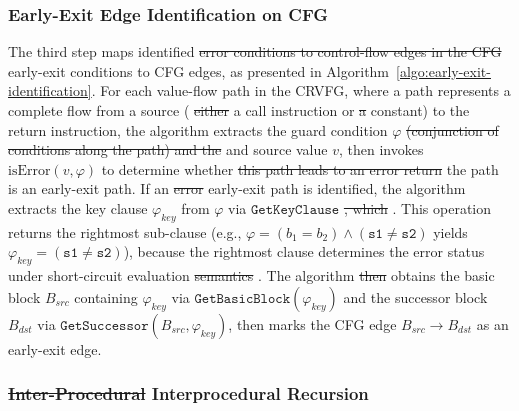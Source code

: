 \documentclass[manuscript,screen,review]{acmart}
\theoremstyle{indenteditalic}
\providecommand{\DIFaddtex}[1]{{\protect\color{blue}#1}} %
\providecommand{\DIFidentity}[1]{#1}
\providecommand{\DIFdeltex}[1]{{%
  \protect\color{red}%
  \normalfont\normalsize
  \let\textbf\DIFidentity
  \let\textit\DIFidentity
  \let\texttt\DIFidentity
  \let\textsc\DIFidentity
  \let\textsf\DIFidentity
  \let\emph\DIFidentity
  \let\uline\DIFidentity
  \sout{#1}%
}} %
\providecommand{\DIFaddbegin}{} %
\providecommand{\DIFaddend}{} %
\providecommand{\DIFdelbegin}{} %
\providecommand{\DIFdelend}{} %
\providecommand{\DIFadd}[1]{\texorpdfstring{\DIFaddtex{#1}}{#1}} %
\providecommand{\DIFdel}[1]{\texorpdfstring{\DIFdeltex{#1}}{}} %
\begin{document}
\subsubsection{Early-Exit Edge Identification on CFG}\label{sec:design:edge-identification}

The third step maps identified \DIFdelbegin \DIFdel{error conditions to control-flow edges in the CFG }\DIFdelend \DIFaddbegin \DIFadd{early-exit conditions to CFG edges}\DIFaddend , as presented in \DIFdelbegin %
\DIFdelend \DIFaddbegin \DIFadd{Algorithm~\ref{algo:early-exit-identification}}\DIFaddend .
For each value-flow path in the CRVFG, where a path represents a complete flow from a source (\DIFdelbegin \DIFdel{either }\DIFdelend a call instruction or \DIFdelbegin \DIFdel{a }\DIFdelend constant) to the return instruction, the algorithm extracts the guard condition $\varphi$ \DIFdelbegin \DIFdel{(conjunction of conditions along the path) and the }\DIFdelend \DIFaddbegin \DIFadd{and }\DIFaddend source value $v$, then invokes $\text{isError}(v, \varphi)$ to determine whether \DIFdelbegin \DIFdel{this path leads to an error return}\DIFdelend \DIFaddbegin \DIFadd{the path is an early-exit path}\DIFaddend .
If an \DIFdelbegin \DIFdel{error }\DIFdelend \DIFaddbegin \DIFadd{early-exit }\DIFaddend path is identified, the algorithm extracts the key clause $\varphi_{key}$ from $\varphi$ via $\texttt{GetKeyClause}$\DIFdelbegin \DIFdel{, which }\DIFdelend \DIFaddbegin \DIFadd{.
This operation }\DIFaddend returns the rightmost sub-clause (e.g., $\varphi=(b_1=b_2)\land(\texttt{s1}\neq\texttt{s2})$ yields $\varphi_{key}=(\texttt{s1}\neq\texttt{s2})$), because the rightmost clause determines the error status under short-circuit evaluation\DIFdelbegin \DIFdel{semantics}\DIFdelend .
The algorithm \DIFdelbegin \DIFdel{then }\DIFdelend obtains the basic block $B_{src}$ containing $\varphi_{key}$ via $\texttt{GetBasicBlock}(\varphi_{key})$ and the successor block $B_{dst}$ via $\texttt{GetSuccessor}(B_{src},\varphi_{key})$, then marks the CFG edge $B_{src}\rightarrow B_{dst}$ as an early-exit \DIFaddbegin \DIFadd{edge}\DIFaddend .

\subsubsection{\DIFdel{Inter-Procedural}\DIFadd{Interprocedural} Recursion}\label{sec:design:inter-procedural-recursion}
\end{document}

